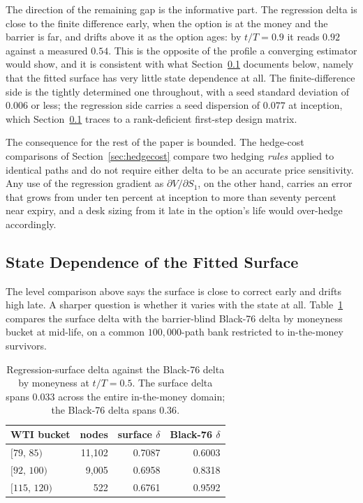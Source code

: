 \documentclass[11pt,a4paper]{article}
\begin{document}
The direction of the remaining gap is the informative part. The regression delta is close to the finite difference early, when the option is at the money and the barrier is far, and drifts above it as the option ages: by $t/T=0.9$ it reads $0.92$ against a measured $0.54$. This is the opposite of the profile a converging estimator would show, and it is consistent with what Section~\ref{sec:awareness} documents below, namely that the fitted surface has very little state dependence at all. The finite-difference side is the tightly determined one throughout, with a seed standard deviation of $0.006$ or less; the regression side carries a seed dispersion of $0.077$ at inception, which Section~\ref{sec:awareness} traces to a rank-deficient first-step design matrix.

The consequence for the rest of the paper is bounded. The hedge-cost comparisons of Section~\ref{sec:hedgecost} compare two hedging \emph{rules} applied to identical paths and do not require either delta to be an accurate price sensitivity. Any use of the regression gradient as $\partial V/\partial S_1$, on the other hand, carries an error that grows from under ten percent at inception to more than seventy percent near expiry, and a desk sizing from it late in the option's life would over-hedge accordingly.

\subsection{State Dependence of the Fitted Surface}
\label{sec:awareness}

The level comparison above says the surface is close to correct early and drifts high late. A sharper question is whether it varies with the state at all. Table~\ref{tab:aware} compares the surface delta with the barrier-blind Black-76 delta by moneyness bucket at mid-life, on a common $100{,}000$-path bank restricted to in-the-money survivors.

\begin{table}[h]
\centering
\small
\begin{tabular}{lrrr}
\toprule
WTI bucket & nodes & surface $\delta$ & Black-76 $\delta$ \\
\midrule
$[79,\,85)$   & 11{,}102 & 0.7087 & 0.6003 \\
$[92,\,100)$  &  9{,}005 & 0.6958 & 0.8318 \\
$[115,\,120)$ &     522 & 0.6761 & 0.9592 \\
\bottomrule
\end{tabular}
\caption{Regression-surface delta against the Black-76 delta by moneyness at $t/T=0.5$. The surface delta spans $0.033$ across the entire in-the-money domain; the Black-76 delta spans $0.36$.}
\label{tab:aware}
\end{table}
\end{document}
